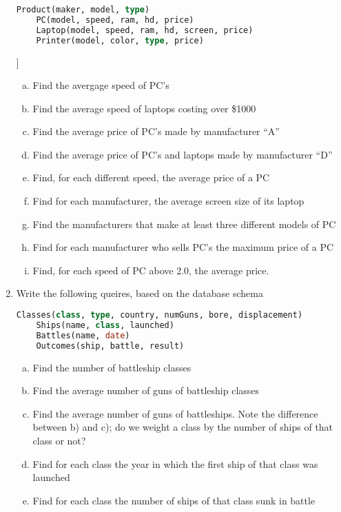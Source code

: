 \documentclass[12pt]{article}
\begin{document}
\begin{enumerate}[1.]
    \begin{lstlisting}[language=SQL]
    Product(maker, model, type)
    PC(model, speed, ram, hd, price)
    Laptop(model, speed, ram, hd, screen, price)
    Printer(model, color, type, price)
    \end{lstlisting}]

    \begin{enumerate}[a)]
        \item Find the avergage speed of PC's
        \item Find the average speed of laptops costing over \$1000
        \item Find the average price of PC's made by manufacturer ``A''
        \item Find the average price of PC's and laptops made by manufacturer ``D''
        \item Find, for each different speed, the average price of a PC
        \item Find for each manufacturer, the average screen size of its laptop
        \item Find the manufacturers that make at least three different models of PC
        \item Find for each manufacturer who sells PC's the maximum price of a PC
        \item Find, for each speed of PC above 2.0, the average price.
    \end{enumerate}

    \item Write the following queires, based on the database schema

    \begin{lstlisting}[language=SQL]
    Classes(class, type, country, numGuns, bore, displacement)
    Ships(name, class, launched)
    Battles(name, date)
    Outcomes(ship, battle, result)
    \end{lstlisting}

    \bigskip

    \begin{enumerate}[a)]
        \item Find the number of battleship classes
        \item Find the average number of guns of battleship classes
        \item Find the average number of guns of battleships. Note the difference
        between b) and c); do we weight a class by the number of ships of that class
        or not?
        \item Find for each class the year in which the first ship of that class was
        launched
        \item Find for each class the number of ships of that class sunk in battle
    \end{enumerate}


\end{enumerate}
\end{document}
